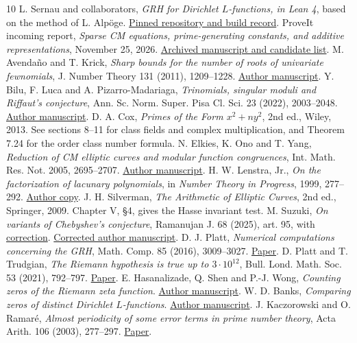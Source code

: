 \documentclass[11pt,letterpaper]{article}
\begin{document}
\clearpage
\begin{thebibliography}{10}
 L. Sernau and collaborators, \emph{GRH for Dirichlet $L$-functions, in Lean 4}, based on the method of L. Alp\"oge. \href{https://github.com/lsernau/grh-lean/tree/72fead102f663d5c7a407964a13dc0cf9d977207}{Pinned repository and build record}.
 ProveIt incoming report, \emph{Sparse CM equations, prime-generating constants, and additive representations}, November 25, 2026. \href{https://github.com/VladimirReshetnikov/ProveIt/blob/c59bde1a0f52eee7a7a8dc6b326072f9b71f76a6/docs/incoming/grh_cm_prime_applications.zip}{Archived manuscript and candidate list}.
 M. Avenda\~no and T. Krick, \emph{Sharp bounds for the number of roots of univariate fewnomials}, J. Number Theory 131 (2011), 1209--1228. \href{https://arxiv.org/abs/1008.4808}{Author manuscript}.
 Y. Bilu, F. Luca and A. Pizarro-Madariaga, \emph{Trinomials, singular moduli and Riffaut's conjecture}, Ann. Sc. Norm. Super. Pisa Cl. Sci. 23 (2022), 2003--2048. \href{https://arxiv.org/abs/2003.06547}{Author manuscript}.
 D. A. Cox, \emph{Primes of the Form $x^2+ny^2$}, 2nd ed., Wiley, 2013. See sections 8--11 for class fields and complex multiplication, and Theorem 7.24 for the order class number formula.
 N. Elkies, K. Ono and T. Yang, \emph{Reduction of CM elliptic curves and modular function congruences}, Int. Math. Res. Not. 2005, 2695--2707. \href{https://arxiv.org/abs/math/0512350}{Author manuscript}.
 H. W. Lenstra, Jr., \emph{On the factorization of lacunary polynomials}, in \emph{Number Theory in Progress}, 1999, 277--292. \href{https://pub.math.leidenuniv.nl/~lenstrahw/PUBLICATIONS/1999b/art.pdf}{Author copy}.
 J. H. Silverman, \emph{The Arithmetic of Elliptic Curves}, 2nd ed., Springer, 2009. Chapter V, \S4, gives the Hasse invariant test.
 M. Suzuki, \emph{On variants of Chebyshev's conjecture}, Ramanujan J. 68 (2025), art. 95, with \href{https://doi.org/10.1007/s11139-025-01289-y}{correction}. \href{https://arxiv.org/abs/2411.07436v3}{Corrected author manuscript}.
 D. J. Platt, \emph{Numerical computations concerning the GRH}, Math. Comp. 85 (2016), 3009--3027. \href{https://doi.org/10.1090/mcom/3077}{Paper}.
 D. Platt and T. Trudgian, \emph{The Riemann hypothesis is true up to $3\cdot10^{12}$}, Bull. Lond. Math. Soc. 53 (2021), 792--797. \href{https://doi.org/10.1112/blms.12460}{Paper}.
 E. Hasanalizade, Q. Shen and P.-J. Wong, \emph{Counting zeros of the Riemann zeta function}. \href{https://arxiv.org/abs/2107.06506}{Author manuscript}.
 W. D. Banks, \emph{Comparing zeros of distinct Dirichlet $L$-functions}. \href{https://arxiv.org/abs/2302.07073}{Author manuscript}.
 J. Kaczorowski and O. Ramar\'e, \emph{Almost periodicity of some error terms in prime number theory}, Acta Arith. 106 (2003), 277--297. \href{https://doi.org/10.4064/aa106-3-6}{Paper}.
\end{thebibliography}
\end{document}
